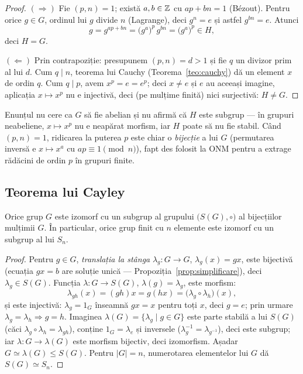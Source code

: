 \begin{proof}
$(\Rightarrow)$ Fie $(p,n)=1$; există $a,b\in\mathbb{Z}$ cu $ap+bn=1$ (Bézout). Pentru orice $g\in G$, ordinul lui $g$ divide $n$ (Lagrange), deci $g^{n}=e$ și astfel $g^{bn}=e$. Atunci
\[
g=g^{ap+bn}=\bigl(g^{a}\bigr)^{p}\,g^{bn}=\bigl(g^{a}\bigr)^{p}\in H,
\]
deci $H=G$.

$(\Leftarrow)$ Prin contrapoziție: presupunem $(p,n)=d>1$ și fie $q$ un divizor prim al lui $d$. Cum $q\mid n$, teorema lui Cauchy (Teorema~\ref{teo:cauchy}) dă un element $x$ de ordin $q$. Cum $q\mid p$, avem $x^{p}=e=e^{p}$; deci $x\neq e$ și $e$ au aceeași imagine, aplicația $x\mapsto x^{p}$ nu e injectivă, deci (pe mulțime finită) nici surjectivă: $H\neq G$.
\end{proof}

\begin{observatie}
Enunțul nu cere ca $G$ să fie abelian și nu afirmă că $H$ este subgrup --- în grupuri neabeliene, $x\mapsto x^p$ nu e neapărat morfism, iar $H$ poate să nu fie stabil. Când $(p,n)=1$, ridicarea la puterea $p$ este chiar o \emph{bijecție} a lui $G$ (permutarea inversă e $x\mapsto x^{a}$ cu $ap\equiv 1\pmod n$), fapt des folosit la ONM pentru a extrage rădăcini de ordin $p$ în grupuri finite.
\end{observatie}

\subsection*{Teorema lui Cayley}

\begin{teorema}[Cayley]\label{teo:cayley}
Orice grup $G$ este izomorf cu un subgrup al grupului $\bigl(S(G),\circ\bigr)$ al bijecțiilor mulțimii $G$. În particular, orice grup finit cu $n$ elemente este izomorf cu un subgrup al lui $S_n$.
\end{teorema}

\begin{proof}
Pentru $g\in G$, \emph{translația la stânga} $\lambda_g:G\to G$, $\lambda_g(x)=gx$, este bijectivă (ecuația $gx=b$ are soluție unică --- Propoziția~\ref{prop:simplificare}), deci $\lambda_g\in S(G)$. Funcția $\lambda:G\to S(G)$, $\lambda(g)=\lambda_g$, este morfism:
\[
\lambda_{gh}(x)=(gh)x=g(hx)=\bigl(\lambda_g\circ\lambda_h\bigr)(x),
\]
și este injectivă: $\lambda_g=1_G$ înseamnă $gx=x$ pentru toți $x$, deci $g=e$; prin urmare $\lambda_g=\lambda_h\Rightarrow g=h$. Imaginea $\lambda(G)=\{\lambda_g\mid g\in G\}$ este parte stabilă a lui $S(G)$ (căci $\lambda_g\circ\lambda_h=\lambda_{gh}$), conține $1_G=\lambda_e$ și inversele ($\lambda_g^{-1}=\lambda_{g^{-1}}$), deci este subgrup; iar $\lambda:G\to\lambda(G)$ este morfism bijectiv, deci izomorfism. Așadar $G\simeq\lambda(G)\le S(G)$. Pentru $|G|=n$, numerotarea elementelor lui $G$ dă $S(G)\simeq S_n$.
\end{proof}

